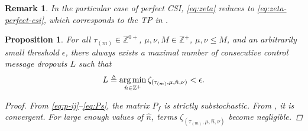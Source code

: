 \documentclass[journal,twoside,web]{ieeecolor}
\newtheorem{corollary}{Corollary}[theorem]
\newtheorem{remark}{Remark}
\newtheorem{proposition}{Proposition}
\begin{document}
\begin{remark}\label{rem:automatica-1}
    In the particular case of perfect CSI, \eqref{eq:zeta} reduces to \eqref{eq:zeta-perfect-csi}, which corresponds to the TP in \cite[Eq. (19)]{yZL-2025-automatica}.
\end{remark}



\begin{proposition}\label{prop:L}
For all $\tau_{(m)} \in \mathbb{Z}^{0+}$,  $\mu,\nu,M \in\mathbb{Z}^{+}$, $\mu,\nu\leq M$, and an arbitrarily small threshold $\epsilon$, there always exists a  maximal number of consecutive control message dropouts $L$ such that
\begin{equation}\label{eq:L}
    \text{\small $L \triangleq \mathop{\mathrm{arg\,min}}_{\hat{n} \in \mathbb{Z}^{+}}
    \zeta_{(\tau_{(m)},\mu,\hat{n},\nu)}<\epsilon.$}
\end{equation}
\begin{proof}
From \eqref{eq:p-ij}–\eqref{eq:Ps}, the matrix $P_{f}$ is strictly substochastic.
From \cite[Th. 8.1.22 and 5.6.12]{horn2012matrix}, it is convergent. For large enough values of $\hat{n}$, terms $\zeta_{(\tau_{(m)},\mu,\hat{n},\nu)}$ become negligible. %
\end{proof}
\end{proposition}
\end{document}
